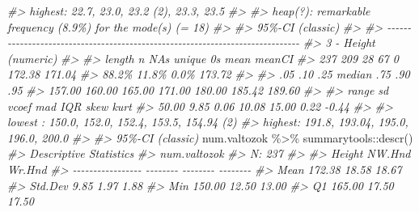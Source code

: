 \documentclass[
]{book}
\newenvironment{Shaded}{\begin{snugshade}}{\end{snugshade}}
\newcommand{\CommentTok}[1]{\textcolor[rgb]{0.56,0.35,0.01}{\textit{#1}}}
\newcommand{\FunctionTok}[1]{\textcolor[rgb]{0.00,0.00,0.00}{#1}}
\newcommand{\NormalTok}[1]{#1}
\newcommand{\SpecialCharTok}[1]{\textcolor[rgb]{0.00,0.00,0.00}{#1}}
\begin{document}
\begin{Shaded}
\begin{Highlighting}[]
\CommentTok{\#\textgreater{} highest: 22.7, 23.0, 23.2 (2), 23.3, 23.5}
\CommentTok{\#\textgreater{} }
\CommentTok{\#\textgreater{} heap(?): remarkable frequency (8.9\%) for the mode(s) (= 18)}
\CommentTok{\#\textgreater{} }
\CommentTok{\#\textgreater{} \textquotesingle{} 95\%{-}CI (classic)}
\CommentTok{\#\textgreater{} }
\CommentTok{\#\textgreater{} {-}{-}{-}{-}{-}{-}{-}{-}{-}{-}{-}{-}{-}{-}{-}{-}{-}{-}{-}{-}{-}{-}{-}{-}{-}{-}{-}{-}{-}{-}{-}{-}{-}{-}{-}{-}{-}{-}{-}{-}{-}{-}{-}{-}{-}{-}{-}{-}{-}{-}{-}{-}{-}{-}{-}{-}{-}{-}{-}{-}{-}{-}{-}{-}{-}{-}{-}{-}{-}{-}{-}{-}{-}{-}{-}{-}{-}{-} }
\CommentTok{\#\textgreater{} 3 {-} Height (numeric)}
\CommentTok{\#\textgreater{} }
\CommentTok{\#\textgreater{}   length       n     NAs  unique      0s    mean  meanCI\textquotesingle{}}
\CommentTok{\#\textgreater{}      237     209      28      67       0  172.38  171.04}
\CommentTok{\#\textgreater{}            88.2\%   11.8\%            0.0\%          173.72}
\CommentTok{\#\textgreater{}                                                         }
\CommentTok{\#\textgreater{}      .05     .10     .25  median     .75     .90     .95}
\CommentTok{\#\textgreater{}   157.00  160.00  165.00  171.00  180.00  185.42  189.60}
\CommentTok{\#\textgreater{}                                                         }
\CommentTok{\#\textgreater{}    range      sd   vcoef     mad     IQR    skew    kurt}
\CommentTok{\#\textgreater{}    50.00    9.85    0.06   10.08   15.00    0.22   {-}0.44}
\CommentTok{\#\textgreater{}                                                         }
\CommentTok{\#\textgreater{} lowest : 150.0, 152.0, 152.4, 153.5, 154.94 (2)}
\CommentTok{\#\textgreater{} highest: 191.8, 193.04, 195.0, 196.0, 200.0}
\CommentTok{\#\textgreater{} }
\CommentTok{\#\textgreater{} \textquotesingle{} 95\%{-}CI (classic)}
\NormalTok{num.valtozok }\SpecialCharTok{\%\textgreater{}\%}\NormalTok{ summarytools}\SpecialCharTok{::}\FunctionTok{descr}\NormalTok{()}
\CommentTok{\#\textgreater{} Descriptive Statistics  }
\CommentTok{\#\textgreater{} num.valtozok  }
\CommentTok{\#\textgreater{} N: 237  }
\CommentTok{\#\textgreater{} }
\CommentTok{\#\textgreater{}                     Height   NW.Hnd   Wr.Hnd}
\CommentTok{\#\textgreater{} {-}{-}{-}{-}{-}{-}{-}{-}{-}{-}{-}{-}{-}{-}{-}{-}{-} {-}{-}{-}{-}{-}{-}{-}{-} {-}{-}{-}{-}{-}{-}{-}{-} {-}{-}{-}{-}{-}{-}{-}{-}}
\CommentTok{\#\textgreater{}              Mean   172.38    18.58    18.67}
\CommentTok{\#\textgreater{}           Std.Dev     9.85     1.97     1.88}
\CommentTok{\#\textgreater{}               Min   150.00    12.50    13.00}
\CommentTok{\#\textgreater{}                Q1   165.00    17.50    17.50}

\end{Highlighting}
\end{Shaded}
\end{document}
